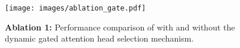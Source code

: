 \begin{figure}[htb]
    \centering
    \texttt{[image: images/ablation\_gate.pdf]}
    \caption{\label{fig:abalation_gate}
    \textbf{Ablation 1:} Performance comparison of \jola{} with and without the dynamic gated attention head selection mechanism. 
    }
\end{figure}
